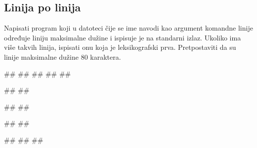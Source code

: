 

\subsection{Linija po linija}

\begin{Exercise}[label=v3_02] 
Napisati program koji u datoteci čije se ime navodi kao argument komandne linije određuje liniju maksimalne dužine i ispisuje je na standarni izlaz. Ukoliko ima više takvih linija, ispisati onu koja je leksikografski prva. Pretpostaviti da su linije maksimalne dužine 
$80$ karaktera.\\
\begin{miditest}
\begin{upotreba}{1}
##
##
##
##
##

#\naslovIzlaz#
##
\end{upotreba}
\end{miditest}
\begin{minitest}
\begin{upotreba}{2}
##
##

#\naslovIzlaz#
##
\end{upotreba}
\end{minitest}
\begin{minitest}
\begin{upotreba}{3}
##
#\naslovIzlaz#
##
\end{upotreba}
\end{minitest}

\end{Exercise}
\begin{Answer}[ref=v3_02]
\end{Answer}

